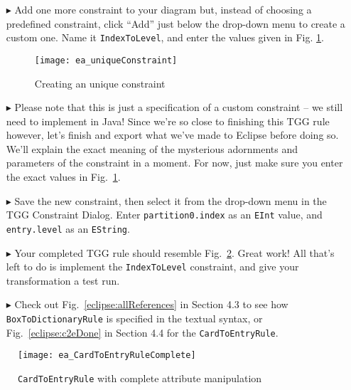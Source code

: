 \begin{enumerate}

\item[$\blacktriangleright$] Add one more constraint to your diagram but, instead of choosing a predefined constraint, click ``Add'' just below the
drop-down menu to create a custom one. Name it \texttt{IndexToLevel}, and enter the values given in Fig. \ref{ea:create_new_constraint}.

\begin{figure}[htbp]
\begin{center}
  \texttt{[image: ea\_uniqueConstraint]}
  \caption{Creating an unique constraint}
  \label{ea:create_new_constraint}
\end{center}
\end{figure}
\FloatBarrier

\item[$\blacktriangleright$] Please note that this is just a specification of a custom constraint -- we still need to implement in Java! Since we're so close to
finishing this TGG rule however, let's finish and export what we've made to Eclipse before doing so. We'll explain the exact meaning of the mysterious
adornments and parameters of the constraint in a moment. For now, just make sure you enter the exact values in Fig.~\ref{ea:create_new_constraint}. 

\item[$\blacktriangleright$] Save the new constraint, then select it from the drop-down menu in the TGG Constraint Dialog. Enter \texttt{partition0.index} as an
\texttt{EInt} value, and \texttt{entry.level} as an \texttt{EString}.

\item[$\blacktriangleright$] Your completed TGG rule should resemble Fig.~\ref{ea:cardtoentry_complete}. Great work! All that's left to do is implement the
\texttt{IndexToLevel} constraint, and give your transformation a test run.

\item[$\blacktriangleright$] Check out Fig.~\ref{eclipse:allReferences} in Section 4.3 to see how \texttt{BoxToDictionaryRule} is specified in the textual
syntax, or Fig.~\ref{eclipse:c2eDone} in Section 4.4 for the \texttt{CardToEntryRule}.

\end{enumerate}

\newpage

\vspace*{3cm}

\begin{figure}[htbp]
\hspace{-2cm}
  \texttt{[image: ea\_CardToEntryRuleComplete]}
  \caption{\texttt{CardToEntryRule} with complete attribute manipulation}
  \label{ea:cardtoentry_complete}
\end{figure}

